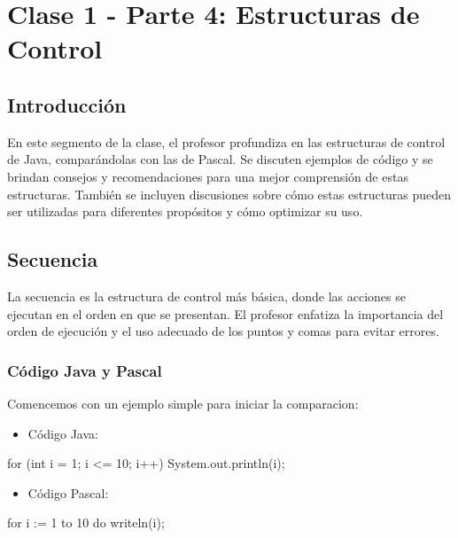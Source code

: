 \documentclass[a4paper]{report}
\begin{document}
\newpage

\maketitle %

\chapter{Clase 1 - Parte 4: Estructuras de Control}
\section{Introducción}

En este segmento de la clase, el profesor profundiza en las estructuras de control de Java, comparándolas con las de Pascal. Se discuten ejemplos de código y se brindan consejos y recomendaciones para una mejor comprensión de estas estructuras. También se incluyen discusiones sobre cómo estas estructuras pueden ser utilizadas para diferentes propósitos y cómo optimizar su uso.

\section{Secuencia}

La secuencia es la estructura de control más básica, donde las acciones se ejecutan en el orden en que se presentan. El profesor enfatiza la importancia del orden de ejecución y el uso adecuado de los puntos y comas para evitar errores.

\subsection{Código Java y Pascal}
Comencemos con un ejemplo simple para iniciar la comparacion:
\begin{itemize}
    \item Código Java:
\end{itemize}

\begin{roundedlst}
for (int i = 1; i <= 10; i++) {
    System.out.println(i);
}
\end{roundedlst}

\begin{itemize}
    \item Código Pascal:
\end{itemize}

\begin{roundedlst}
for i := 1 to 10 do writeln(i);
\end{roundedlst}
\end{document}
